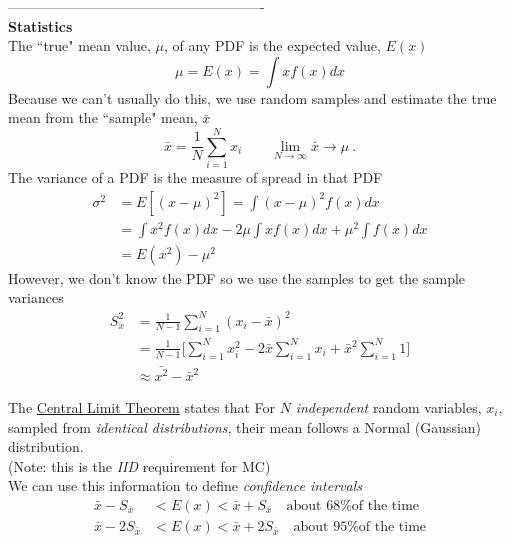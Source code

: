\documentclass[12pt]{article}
\begin{document}
-------------------------------------------------------\\
\textbf{Statistics}\\
The ``true" mean value, $\mu$, of any PDF is the expected value, $E(x)$
\[
\mu = E(x) = \int x f(x) dx
\]
Because we can't usually do this, we use random samples and estimate the true mean from the ``sample" mean, $\bar{x}$
\[
\bar{x} = \frac{1}{N}\sum_{i=1}^N x_i \qquad \lim_{N \to \infty} \bar{x} \rightarrow \mu\:.
\]
The variance of a PDF is the measure of spread in that PDF
\begin{align*}
\sigma^2 &= E[(x - \mu)^2] = \int (x - \mu)^2 f(x) dx \\
&= \int x^2 f(x) dx - 2 \mu \int x f(x) dx + \mu^2 \int f(x) dx\\
&= E(x^2) - \mu^2
\end{align*}
%
However, we don't know the PDF so we use the samples to get the sample variances
\begin{align*}
S_x^2 &= \frac{1}{N-1}\sum_{i=1}^N (x_i - \bar{x})^2 \\
&= \frac{1}{N-1} \biggl[\sum_{i=1}^N x_i^2 - 2 \bar{x}\sum_{i=1}^N x_i + \bar{x}^2 \sum_{i=1}^N 1 \biggr] \\
&\approx \bar{x^2} - \bar{x}^2
\end{align*}

The \underline{Central Limit Theorem} states that
For $N$ \textit{independent} random variables, $x_i$, sampled from \textit{identical distributions}, their mean follows a Normal (Gaussian) distribution.\\
(Note: this is the \textit{IID} requirement for MC)\\
We can use this information to define \textit{confidence intervals}
\begin{align*}
\bar{x} - S_{\bar{x}} &< E(x) < \bar{x} + S_{\bar{x}} \quad \text{about 68\% of the time}\\
\bar{x} - 2S_{\bar{x}} &< E(x) < \bar{x} + 2S_{\bar{x}} \quad \text{about 95\% of the time}
\end{align*}
\end{document}
